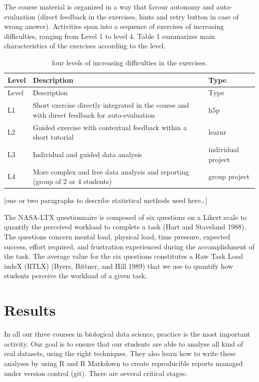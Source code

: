 \documentclass[
]{article}
\begin{document}
The course material is organized in a way that favour autonomy and
auto-evaluation (direct feedback in the exercises, hints and retry
button in case of wrong answer). Activities span into a sequence of
exercises of increasing difficulties, ranging from Level 1 to level 4.
Table 1 summarizes main characteristics of the exercises according to
the level.

\begin{longtable}[]{@{}
  >{\raggedright\arraybackslash}p{}
  >{\raggedright\arraybackslash}p{}
  >{\raggedright\arraybackslash}p{}@{}}
\caption{four levels of increasing difficulties in the
exercises.}\tabularnewline
\toprule
Level & Description & Type \\
\midrule
\endfirsthead
\toprule
Level & Description & Type \\
\midrule
\endhead
L1 & Short exercise directly integrated in the course and with direct
feedback for auto-evaluation & h5p \\
L2 & Guided exercise with contextual feedback within a short tutorial &
learnr \\
L3 & Individual and guided data analysis & individual project \\
L4 & More complex and free data analysis and reporting (group of 2 or 4
students) & group project \\
\bottomrule
\end{longtable}

{[}one or two paragraphs to describe statistical methods used
here\ldots{]}

The NASA-LTX questionnaire is composed of six questions on a Likert
scale to quantify the perceived workload to complete a task (Hart and
Staveland 1988). The questions concern mental load, physical load, time
pressure, expected success, effort required, and frustration experienced
during the accomplishment of the task. The average value for the six
questions constitutes a Raw Task Load indeX (RTLX) (Byers, Bittner, and
Hill 1989) that we use to quantify how students perceive the workload of
a given task.

\hypertarget{results}{%
\section{Results}\label{results}}

In all our three courses in biological data science, practice is the
most important activity. Our goal is to ensure that our students are
able to analyse all kind of real datasets, using the right techniques.
They also learn how to write these analyses by using R and R Markdown to
create reproducible reports managed under version control (git). There
are several critical stages:
\end{document}

